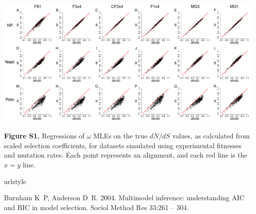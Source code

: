 \documentclass[11pt]{article}
\begin{document}
\newpage

\begin{landscape}
	\includegraphics[width=9.5in]{figures/SI/nyp_regression.pdf}
	\vspace{0.5cm}
	
	\textbf{Figure S1.} Regressions of $\omega$ MLEs on the true $dN/dS$ values, as calculated from scaled selection coefficients, for datasets simulated using experimental fitnesses and mutation rates. Each point represents an alignment, and each red line is the $x=y$ line.
\end{landscape}


\newpage

\begin{thebibliography}{79}
\providecommand{\natexlab}[1]{#1}
\expandafter\ifx\csname urlstyle\endcsname\relax
  \providecommand{\doi}[1]{doi:\discretionary{}{}{}#1}\else
  \providecommand{\doi}{doi:\discretionary{}{}{}\begingroup
  \urlstyle{rm}\Url}\fi
  
Burnham K~P, Anderson D~R. 2004.
\newblock Multimodel inference: understanding {AIC} and {BIC} in model
  selection.
\newblock Sociol Method Res 33:261 -- 304.

\end{thebibliography}
\end{document}
